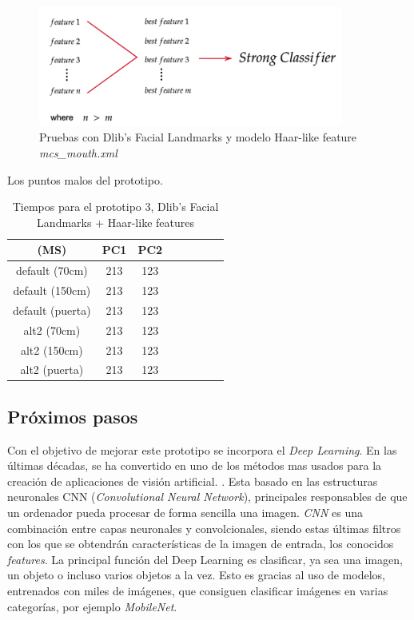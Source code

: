 \begin{figure}[htp]
	\centering
	\includegraphics[width=10cm]{imagenes/ada1.png}
	\caption{Pruebas con Dlib's Facial Landmarks y modelo Haar-like feature \textit{mcs\_mouth.xml}}
	\label{fig:dlibLandmarks}
\end{figure}

Los puntos malos del prototipo.

\begin{table}[h!]
	\begin{center}
		\begin{tabular}{ |c|c|c|c|c|c|c|c| } 
			\hline
			(MS) & PC1 & PC2 \\
			\hline
			default (70cm) & 213  & 123  \\
			\hline
			default (150cm) & 213  & 123 \\
			\hline
			default (puerta) & 213  & 123 \\
			\hline
			alt2 (70cm) & 213  & 123  \\
			\hline
			alt2 (150cm) & 213  & 123 \\
			\hline
			alt2 (puerta) & 213  & 123 \\
			\hline
		\end{tabular}
		\caption{Tiempos para el prototipo 3, Dlib's Facial Landmarks + Haar-like features}
		\label{tab:table4}
	\end{center}
\end{table}



\subsection*{Próximos pasos}

Con el objetivo de mejorar este prototipo se incorpora el \textit{Deep Learning}. En las últimas décadas, se ha convertido en uno de los métodos mas usados para la creación de aplicaciones de visión artificial. \cite{szeliski_2018}. Esta basado en las estructuras neuronales CNN (\textit{Convolutional Neural Network}), principales responsables de que un ordenador pueda procesar de forma sencilla una imagen. \textit{CNN} es una combinación entre capas neuronales y convolcionales, siendo estas últimas filtros con los que se obtendrán características de la imagen de entrada, los conocidos \textit{features}. La principal función del Deep Learning es clasificar, ya sea una imagen, un objeto o incluso varios objetos a la vez. Esto es gracias al uso de modelos, entrenados con miles de imágenes, que consiguen clasificar imágenes en varias categorías, por ejemplo \textit{MobileNet}. \cite{cnn}

